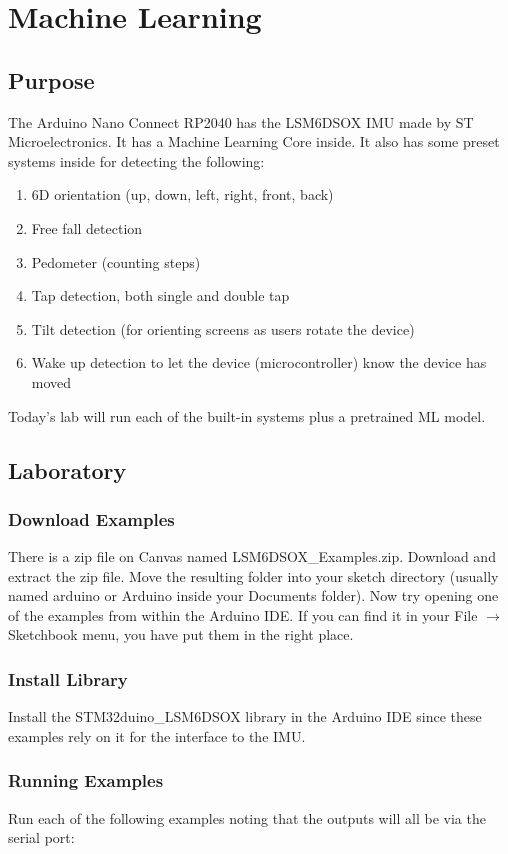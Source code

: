 \chapter{Machine Learning}

\section{Purpose}
The Arduino Nano Connect RP2040 has the LSM6DSOX IMU made by ST Microelectronics. It has 
a Machine Learning Core inside. It also has some preset systems inside for detecting 
the following:
\begin{enumerate}
    \item 6D orientation (up, down, left, right, front, back)
    \item Free fall detection 
    \item Pedometer (counting steps)
    \item Tap detection, both single and double tap 
    \item Tilt detection (for orienting screens as users rotate the device)
    \item Wake up detection to let the device (microcontroller) know the device has moved
\end{enumerate}
Today's lab will run each of the built-in systems plus a pretrained ML model.

\section{Laboratory}
\subsection{Download Examples}
There is a zip file on Canvas named LSM6DSOX\_Examples.zip. Download and extract the zip 
file. Move the resulting folder into your sketch directory (usually named arduino or Arduino 
inside your Documents folder). Now try opening one of the examples from within the Arduino IDE.
If you can find it in your File $\rightarrow$ Sketchbook menu, you have put them in the right
place.

\subsection{Install Library}
Install the STM32duino\_LSM6DSOX library in the Arduino IDE since these examples rely on 
it for the interface to the IMU.

\subsection{Running Examples}
Run each of the following examples noting that the outputs will all be via the serial port:

